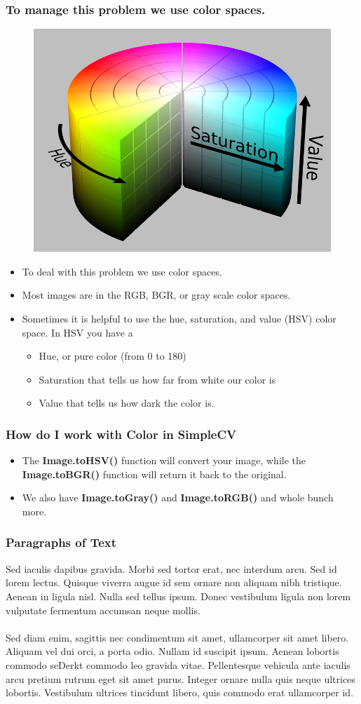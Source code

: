 \documentclass{beamer}
\begin{document}
\begin{frame}
\frametitle{To manage this problem we use color spaces.}
 \begin{figure}
     \includegraphics[width=0.4\linewidth]{hsv.png}
 \end{figure}
\begin{itemize}
\item To deal with this problem we use color spaces. 
\item Most images are in the RGB, BGR, or gray scale color spaces.
\item Sometimes it is helpful to use the hue, saturation, and value (HSV)
color space. In HSV you have a 
\begin{itemize}
\item Hue, or pure color (from 0 to 180) 
\item Saturation that tells us how far from white our color is
\item Value that tells us how dark the color is.
\end{itemize}
\end{itemize}
\end{frame}


\begin{frame}
\frametitle{How do I work with Color in SimpleCV}
\begin{itemize}
\item The \textbf{Image.toHSV()} function will convert your image, while the
\textbf{Image.toBGR()} function will return it back to the original.
\item We also have \textbf{Image.toGray()} and \textbf{Image.toRGB()}
  and whole bunch more. 

\end{itemize}
\end{frame}



\begin{frame}
  \frametitle{Paragraphs of Text}
  Sed iaculis dapibus gravida. Morbi sed tortor erat, nec interdum arcu. Sed id lorem lectus. Quisque viverra augue id sem ornare non aliquam nibh tristique. Aenean in ligula nisl. Nulla sed tellus ipsum. Donec vestibulum ligula non lorem vulputate fermentum accumsan neque mollis.\\~\\

  Sed diam enim, sagittis nec condimentum sit amet, ullamcorper sit
  amet libero. Aliquam vel dui orci, a porta odio. Nullam id suscipit
  ipsum. Aenean lobortis commodo seDerkt commodo leo gravida
  vitae. Pellentesque vehicula ante iaculis arcu pretium rutrum eget
  sit amet purus. Integer ornare nulla quis neque ultrices
  lobortis. Vestibulum ultrices tincidunt libero, quis commodo erat
  ullamcorper id.
\end{frame}
\end{document}
